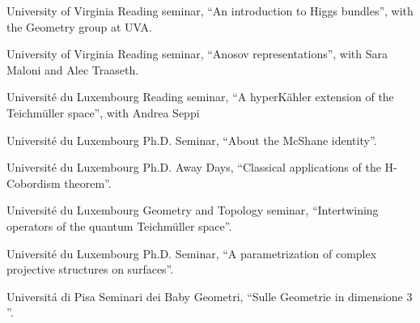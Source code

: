 {University of Virginia}
{Reading seminar,}
{``An introduction to Higgs bundles'', with the Geometry group at UVA.}

{University of Virginia}
{Reading seminar,}
{``Anosov representations'', with Sara Maloni and Alec Traaseth.}

{Universit{\'e} du Luxembourg}
{Reading seminar,}
{``A hyperK{\"a}hler extension of the Teichm{\"u}ller space'', with Andrea Seppi}

{Universit{\'e} du Luxembourg}
{Ph.D. Seminar,}
{``About the McShane identity''.}

{Universit{\'e} du Luxembourg}
{Ph.D. Away Days,}
{``Classical applications of the H-Cobordism theorem''.}

{Universit{\'e} du Luxembourg}
{Geometry and Topology seminar,}
{``Intertwining operators of the quantum Teichm\"uller space''.}

{Universit{\'e} du Luxembourg}
{Ph.D. Seminar,}
{``A parametrization of complex projective structures on surfaces''.}

{Universit{\'a} di Pisa}
{Seminari dei Baby Geometri,}
{``Sulle Geometrie in dimensione $3$''.}
